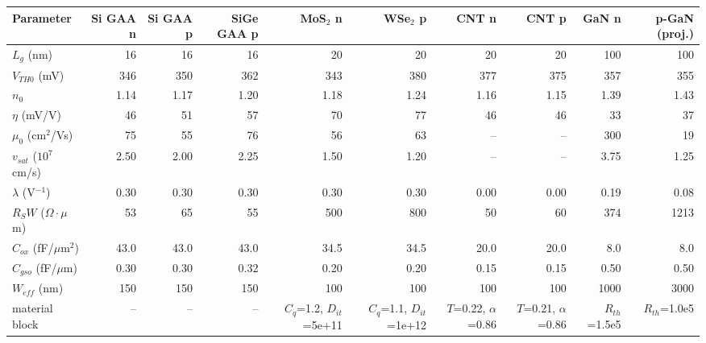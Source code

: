 \begin{tabular}{lrrrrrrrrr}
\hline
Parameter & Si GAA n & Si GAA p & SiGe GAA p & MoS$_2$ n & WSe$_2$ p & CNT n & CNT p & GaN n & p-GaN (proj.) \\
\hline
$L_g$ (nm) & 16 & 16 & 16 & 20 & 20 & 20 & 20 & 100 & 100 \\
$V_{TH0}$ (mV) & 346 & 350 & 362 & 343 & 380 & 377 & 375 & 357 & 355 \\
$n_0$ & 1.14 & 1.17 & 1.20 & 1.18 & 1.24 & 1.16 & 1.15 & 1.39 & 1.43 \\
$\eta$ (mV/V) & 46 & 51 & 57 & 70 & 77 & 46 & 46 & 33 & 37 \\
$\mu_0$ (cm$^2$/Vs) & 75 & 55 & 76 & 56 & 63 & -- & -- & 300 & 19 \\
$v_{sat}$ ($10^7$ cm/s) & 2.50 & 2.00 & 2.25 & 1.50 & 1.20 & -- & -- & 3.75 & 1.25 \\
$\lambda$ (V$^{-1}$) & 0.30 & 0.30 & 0.30 & 0.30 & 0.30 & 0.00 & 0.00 & 0.19 & 0.08 \\
$R_{S}W$ ($\Omega\cdot\mu$m) & 53 & 65 & 55 & 500 & 800 & 50 & 60 & 374 & 1213 \\
$C_{ox}$ (fF/$\mu$m$^2$) & 43.0 & 43.0 & 43.0 & 34.5 & 34.5 & 20.0 & 20.0 & 8.0 & 8.0 \\
$C_{gso}$ (fF/$\mu$m) & 0.30 & 0.30 & 0.32 & 0.20 & 0.20 & 0.15 & 0.15 & 0.50 & 0.50 \\
$W_{eff}$ (nm) & 150 & 150 & 150 & 100 & 100 & 100 & 100 & 1000 & 3000 \\
material block & -- & -- & -- & $C_q$=1.2, $D_{it}$=5e+11 & $C_q$=1.1, $D_{it}$=1e+12 & $T$=0.22, $\alpha$=0.86 & $T$=0.21, $\alpha$=0.86 & $R_{th}$=1.5e5 & $R_{th}$=1.0e5 \\
\hline
\end{tabular}
